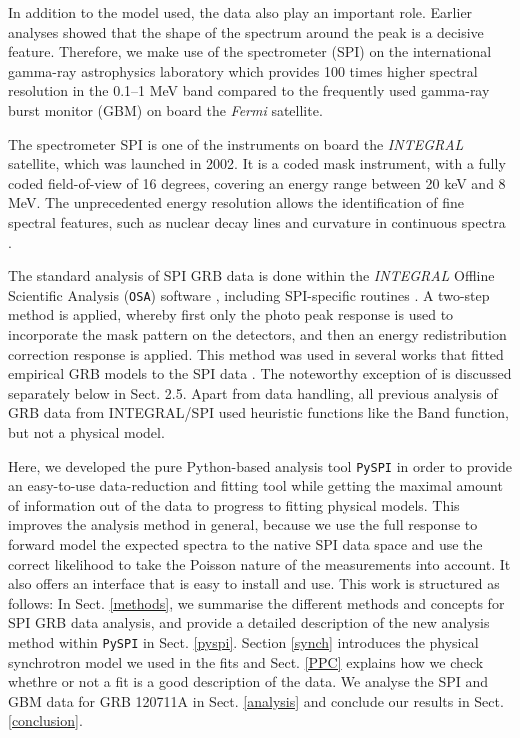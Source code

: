 \documentclass{aa}
\begin{document}
In addition to the model used, the data also play an important role. Earlier analyses showed that the shape of the spectrum around the peak is a decisive feature. Therefore, we make use of the spectrometer (SPI) on the international gamma-ray astrophysics laboratory \citep[\textit{INTEGRAL};][]{integral} which provides 100 times higher spectral resolution in the 0.1--1 MeV band compared to the frequently used gamma-ray burst monitor (GBM) on board the \textit{Fermi} satellite.

The spectrometer SPI \citep{spi_main} is one of the instruments on board the \textit{INTEGRAL} satellite, which was launched in 2002. It is a coded mask instrument, with a fully coded field-of-view of 16 degrees, covering an energy range between 20 keV and 8 MeV. The unprecedented energy resolution allows the identification of fine spectral features, such as nuclear decay lines \citep{Roques-2003, Diehl-2006} and curvature in continuous spectra \citep{Jourdain-2020}.


The standard analysis of SPI GRB data is done within the \textit{INTEGRAL} Offline Scientific Analysis ({\tt OSA}) software \citep{osa}, including SPI-specific routines \citep{Diehl-2003}. A two-step method is applied, whereby first only the photo peak response is used to incorporate the mask pattern on the detectors, and then an energy redistribution correction response is applied. This method was used in several works that fitted empirical GRB models to the SPI data \citep{Malaguti-2003, Mereghetti-2003, Mereghetti-2003.2, Kienlin-2003, Kienlin-2003.2,Beckmann-2004, Moran-2005, Filliatre-2005.1, Filliatre-2005.2, McBreen-2006, Grebenev-2007, McGlynn-2008, Foley-2008, McGlynn-2009, Martin-Carrillo-2014}. The noteworthy exception of \citet{Bosnjak-2014} is discussed separately below in Sect. 2.5. Apart from data handling, all previous analysis of GRB data from INTEGRAL/SPI used heuristic functions like the Band function, but not a physical model.

Here, we developed the pure Python-based analysis tool {\tt PySPI} in order to provide an easy-to-use data-reduction and fitting tool while getting the maximal amount of information out of the data to progress to fitting physical models. This improves the analysis method in general, because we use the full response to forward model the expected spectra to the native SPI data space and use the correct likelihood to take the Poisson nature of the measurements into account. It also offers an  interface that is easy to install and use.
This work is structured as follows: In Sect. \ref{methods}, we summarise the different methods and concepts for SPI GRB data analysis, and provide a detailed description of the new analysis method within {\tt PySPI} in Sect. \ref{pyspi}. Section \ref{synch} introduces the physical synchrotron model we used in the fits and Sect. \ref{PPC} explains how we check whethre or not a fit is a good description of the data. We analyse the SPI and GBM data for GRB 120711A in Sect. \ref{analysis} and conclude our results in Sect. \ref{conclusion}.
\end{document}

